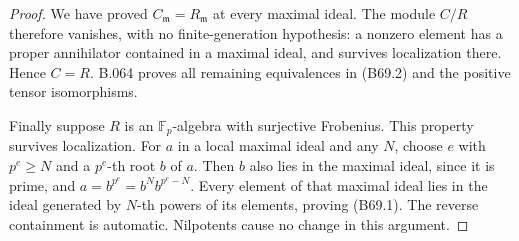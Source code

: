 \begin{proof}
We have proved $C_{\mathfrak m}=R_{\mathfrak m}$ at every maximal ideal.
The module $C/R$ therefore vanishes, with no finite-generation hypothesis:
a nonzero element has a proper annihilator contained in a maximal ideal,
and survives localization there. Hence $C=R$. B.064 proves all remaining
equivalences in (B69.2) and the positive tensor isomorphisms.

Finally suppose $R$ is an $\mathbb F_p$-algebra with surjective Frobenius.
This property survives localization. For $a$ in a local maximal ideal
and any $N$, choose $e$ with $p^e\ge N$ and a $p^e$-th root $b$ of $a$.
Then $b$ also lies in the maximal ideal, since it is prime, and
$a=b^{p^e}=b^N b^{p^e-N}$. Every element of that maximal ideal lies in the
ideal generated by $N$-th powers of its elements, proving (B69.1).
The reverse containment is automatic. Nilpotents cause no change in
this argument.
\end{proof}
